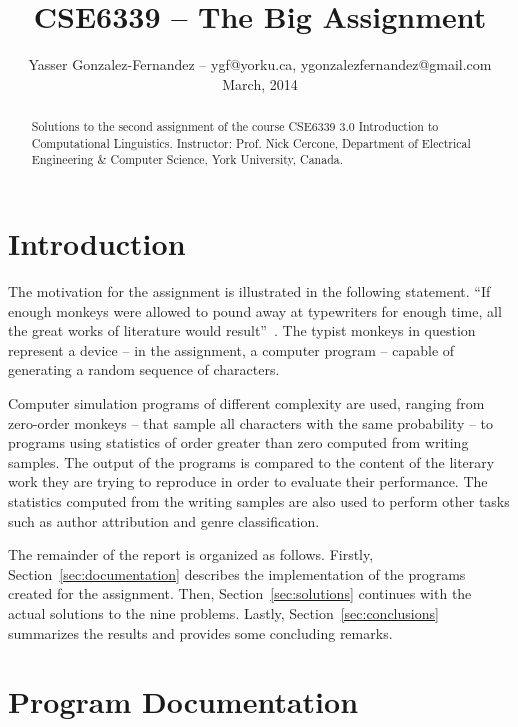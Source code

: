 \documentclass[conference]{IEEEtran}
\begin{document}
\title{CSE6339 -- The Big Assignment\vspace{-14pt}}
\author{Yasser Gonzalez-Fernandez -- ygf@yorku.ca, ygonzalezfernandez@gmail.com\vspace{4pt} \\ March, 2014}

\maketitle


\begin{abstract}
Solutions to the second assignment of the course CSE6339 3.0 Introduction to Computational Linguistics. 
Instructor: Prof. Nick Cercone, Department of Electrical Engineering \& Computer Science, York University, Canada.
\end{abstract}


\section{Introduction}

The motivation for the assignment is illustrated in the following statement.
``If enough monkeys were allowed to pound away at typewriters for enough time, all the great works of literature would result''~\cite{Bennett1976}.
The typist monkeys in question represent a device 
-- in the assignment, a computer program -- 
capable of generating a random sequence of characters.

Computer simulation programs of different complexity are used, ranging from zero-order monkeys 
-- that sample all characters with the same probability -- 
to programs using statistics of order greater than zero computed from writing samples.
The output of the programs is compared to the content of the literary work they are trying to reproduce in order to evaluate their performance.
The statistics computed from the writing samples are also used to perform other tasks such as author attribution and genre classification.

The remainder of the report is organized as follows.
Firstly, Section~\ref{sec:documentation} describes the implementation of the programs created for the assignment.
Then, Section~\ref{sec:solutions} continues with the actual solutions to the nine problems.
Lastly, Section~\ref{sec:conclusions} summarizes the results and provides some concluding remarks.


\section{Program Documentation\label{sec:documentation}}
\end{document}
